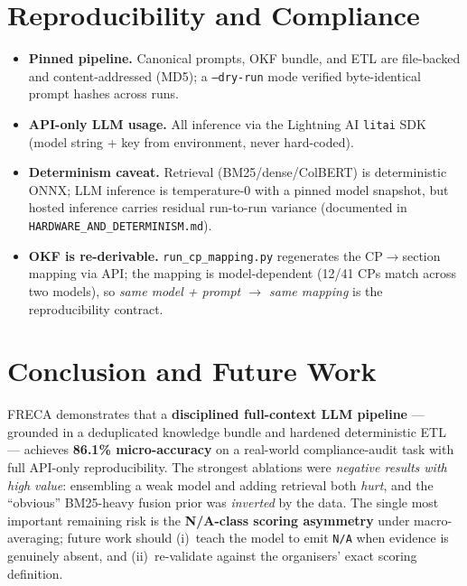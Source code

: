\documentclass[11pt,a4paper]{article}
\begin{document}
\section{Reproducibility and Compliance}
\begin{itemize}[itemsep=2pt]
  \item \textbf{Pinned pipeline.} Canonical prompts, OKF bundle, and ETL are file-backed and content-addressed (MD5); a \texttt{--dry-run} mode verified byte-identical prompt hashes across runs.
  \item \textbf{API-only LLM usage.} All inference via the Lightning AI \texttt{litai} SDK (model string + key from environment, never hard-coded).
  \item \textbf{Determinism caveat.} Retrieval (BM25/dense/ColBERT) is deterministic ONNX; LLM inference is temperature-0 with a pinned model snapshot, but hosted inference carries residual run-to-run variance (documented in \texttt{HARDWARE\_AND\_DETERMINISM.md}).
  \item \textbf{OKF is re-derivable.} \texttt{run\_cp\_mapping.py} regenerates the CP$\to$section mapping via API; the mapping is model-dependent (12/41 CPs match across two models), so \emph{same model + prompt $\to$ same mapping} is the reproducibility contract.
\end{itemize}

\section{Conclusion and Future Work}
FRECA demonstrates that a \textbf{disciplined full-context LLM pipeline} --- grounded in a deduplicated knowledge bundle and hardened deterministic ETL --- achieves \textbf{86.1\% micro-accuracy} on a real-world compliance-audit task with full API-only reproducibility. The strongest ablations were \emph{negative results with high value}: ensembling a weak model and adding retrieval both \emph{hurt}, and the ``obvious'' BM25-heavy fusion prior was \emph{inverted} by the data. The single most important remaining risk is the \textbf{N/A-class scoring asymmetry} under macro-averaging; future work should (i)~teach the model to emit \texttt{N/A} when evidence is genuinely absent, and (ii)~re-validate against the organisers' exact scoring definition.
\end{document}
